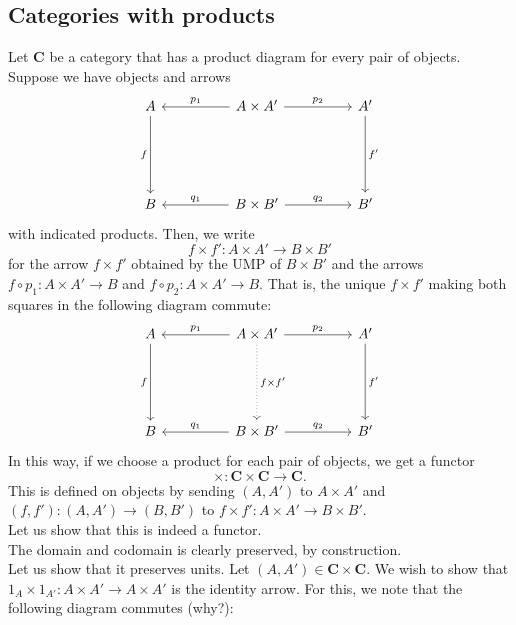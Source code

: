 \documentclass[11pt,leqno,landscape,semhelv]{seminar}
\numberwithin{equation}{section}
\theoremstyle{definition}
\numberwithin{thm}{section}
\numberwithin{equation}{section}
\begin{document}
\subsection{Categories with products}
Let $\mathbf{C}$ be a category that has a product diagram for every pair of objects. Suppose we have objects and arrows
\begin{equation*} 
	\begin{tikzcd}
		A \arrow[ddd, "f"'] && A \times A' \arrow[ll, "p_1"'] \arrow[rr, "p_2"] && A' \arrow[ddd, "f'"]\\
		&&&&\\&&&&\\
		B && B \times B' \arrow[ll, "q_1"'] \arrow[rr, "q_2"] && B'
	\end{tikzcd}
\end{equation*}
with indicated products. Then, we write
\begin{equation*} 
	f \times f' : A \times A' \to B \times B'
\end{equation*}
for the arrow $f\times f'$ obtained by the UMP of $B \times B'$ and the arrows $f\circ p_1:A\times A' \to B$ and $f\circ p_2:A\times A' \to B.$ That is, the unique $f\times f'$ making both squares in the following diagram commute:
\begin{equation*} 
	\begin{tikzcd}
		A \arrow[ddd, "f"'] && A \times A' \arrow[ll, "p_1"'] \arrow[rr, "p_2"] \arrow[ddd, "f\times f'", dotted] && A' \arrow[ddd, "f'"]\\
		&&&&\\&&&&\\
		B && B \times B' \arrow[ll, "q_1"'] \arrow[rr, "q_2"] && B'
	\end{tikzcd}
\end{equation*}
In this way, if we choose a product for each pair of objects, we get a functor
\begin{equation*} 
	\times : \mathbf{C} \times \mathbf{C} \to \mathbf{C}.
\end{equation*}
This is defined on objects by sending $(A, A')$ to $A \times A'$ and $(f, f'):(A, A') \to (B, B')$ to $f\times f':A \times A' \to B \times B'.$\\
Let us show that this is indeed a functor.\\
The domain and codomain is clearly preserved, by construction.\\
Let us show that it preserves units. Let $(A, A') \in \mathbf{C} \times \mathbf{C}.$ We wish to show that $1_A\times 1_{A'}:A\times A' \to A\times A'$ is the identity arrow. For this, we note that the following diagram commutes (why?):
\end{document}
